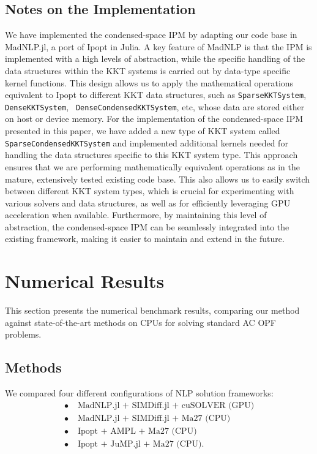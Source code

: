 \subsection{Notes on the Implementation}
We have implemented the condensed-space IPM by adapting our code base
in MadNLP.jl, a port of Ipopt in Julia.
A key feature of MadNLP is that the IPM is implemented with a
high levels of abstraction, while the specific handling of the data
structures within the KKT systems is carried out by data-type specific
kernel functions. This design allows us to apply the mathematical
operations equivalent to Ipopt to different KKT data structures, such as
{\tt SparseKKTSystem}, {\tt DenseKKTSystem}, {\tt
DenseCondensedKKTSystem}, etc, whose data are stored either on host or
device memory. For the implementation of the condensed-space IPM
presented in this paper, we have added a new type of KKT system called
{\tt SparseCondensedKKTSystem} and implemented additional kernels
needed for handling the data structures specific to this KKT system
type. This approach ensures that we are performing mathematically
equivalent operations as in the mature, extensively tested existing
code base. This also allows us to easily switch between different KKT
system types, which is crucial for experimenting with various solvers
and data structures, as well as for efficiently leveraging GPU
acceleration when available. Furthermore, by maintaining this level of
abstraction, the condensed-space IPM can be seamlessly integrated into
the existing framework, making it easier to maintain and extend in the
future.

\section{Numerical Results}\label{sec:num}

This section presents the numerical benchmark results, comparing our
method against state-of-the-art methods on CPUs for solving standard
AC OPF problems.

\subsection{Methods}

We compared four different configurations of NLP solution frameworks:
\begin{align}
  \label{config-1}\tag{Config 1} \bullet\;&\text{MadNLP.jl + SIMDiff.jl + cuSOLVER (GPU)}\\
  \label{config-2}\tag{Config 2} \bullet\;&\text{MadNLP.jl + SIMDiff.jl + Ma27 (CPU)}\\
  \label{config-3}\tag{Config 3} \bullet\;&\text{Ipopt + AMPL + Ma27 (CPU)}\\
  \label{config-4}\tag{Config 4} \bullet\;&\text{Ipopt + JuMP.jl + Ma27 (CPU)}.
\end{align}

